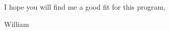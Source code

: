 \documentclass[11pt, letterpaper]{awesome-cv}
\begin{document}
I hope you will find me a good fit for this program,

William

  
% 
%
%
%
%
%
%
%


\end{document}
